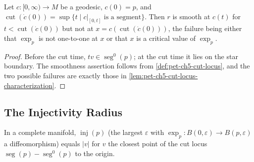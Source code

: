\begin{corollary}
  \label{cor:pet-ch5-cut-locus-smoothness}
  Let $c:[0,\infty)\to M$ be a geodesic, $c(0)=p$, and
  $\operatorname{cut}(\dot c(0))=\sup\{t\mid c|_{[0,t]}\text{ is a segment}\}$. Then
  $r$ is smooth at $c(t)$ for $t<\operatorname{cut}(\dot c(0))$ but not at
  $x=c(\operatorname{cut}(\dot c(0)))$, the failure being either that $\exp_p$ is
  not one-to-one at $x$ or that $x$ is a critical value of $\exp_p$.
\end{corollary}
\begin{proof}
  \sketch
  Before the cut time, $tv\in\operatorname{seg}^0(p)$; at the cut time it lies on
  the star boundary.  The smoothness assertion follows from
  \cref{def:pet-ch5-cut-locus}, and the two possible failures are exactly those in
  \cref{lem:pet-ch5-cut-locus-characterization}.
\end{proof}

\subsection{The Injectivity Radius}

\begin{remark}
  \label{rem:pet-ch5-injectivity-radius-cut-locus}
  In a complete manifold, $\operatorname{inj}(p)$ (the largest $\varepsilon$ with
  $\exp_p:B(0,\varepsilon)\to B(p,\varepsilon)$ a diffeomorphism) equals $|v|$ for
  $v$ the closest point of the cut locus
  $\operatorname{seg}(p)-\operatorname{seg}^0(p)$ to the origin.
\end{remark}

